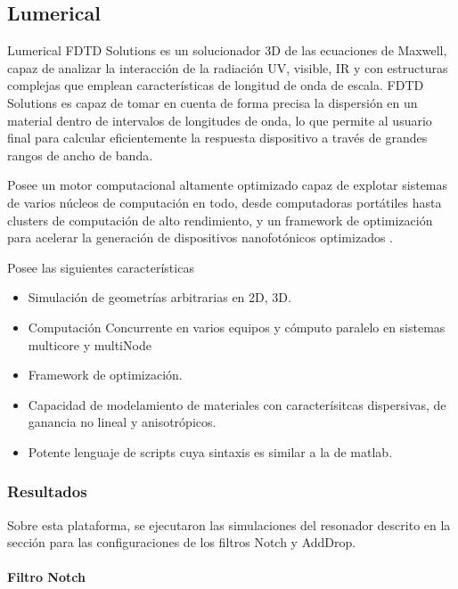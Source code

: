 \subsection{Lumerical}
\label{ss:lumerical}

Lumerical FDTD Solutions es un solucionador 3D de las ecuaciones de Maxwell, 
capaz de analizar la interacción de la radiación UV, visible, IR y con estructuras complejas
 que emplean características de longitud de onda de escala. 
FDTD Solutions es capaz de tomar en cuenta de forma precisa la dispersión en un material dentro de 
intervalos de longitudes de onda, lo que permite al usuario final para calcular eficientemente la respuesta dispositivo a través de grandes rangos de ancho de banda. 

Posee un motor computacional altamente optimizado capaz de explotar sistemas de varios núcleos de computación en todo, desde computadoras portátiles hasta clusters de computación de alto rendimiento, y un framework de optimización para acelerar la generación de dispositivos nanofotónicos optimizados \cite{Lumerical_web}.

Posee las siguientes características

\begin{itemize}
\item Simulación de geometrías arbitrarias en 2D, 3D.
\item Computación Concurrente en varios equipos y cómputo paralelo en sistemas 
multicore y multiNode
\item Framework de optimización.
\item Capacidad de modelamiento de materiales con caracterísitcas dispersivas, 
de ganancia no lineal y anisotrópicos.
\item Potente lenguaje de scripts cuya sintaxis es similar a la de matlab.
\end{itemize} 

\subsubsection{Resultados}

Sobre esta plataforma, se ejecutaron las simulaciones del resonador descrito en la
sección \label{sss:rr_design} para las configuraciones de los filtros Notch y 
AddDrop. 

\paragraph{Filtro Notch}~\\

